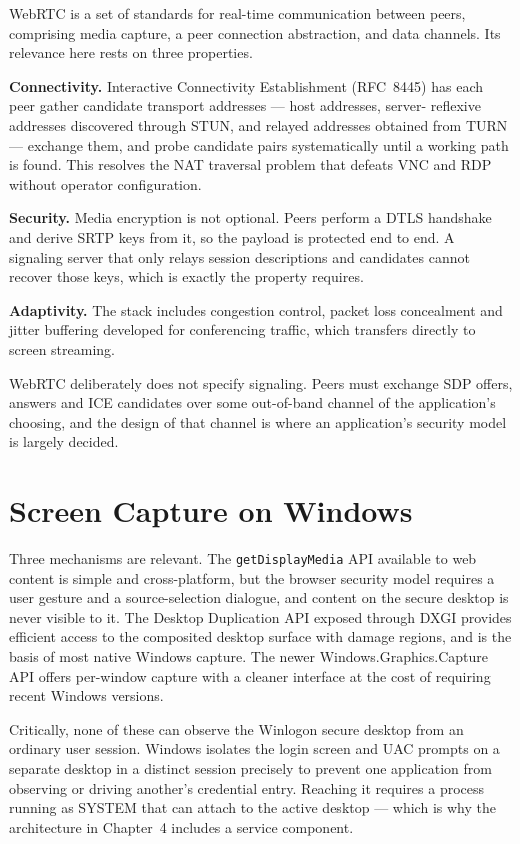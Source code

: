 WebRTC is a set of standards for real-time communication between peers,
comprising media capture, a peer connection abstraction, and data channels. Its
relevance here rests on three properties.

\textbf{Connectivity.} Interactive Connectivity Establishment (RFC~8445) has
each peer gather candidate transport addresses --- host addresses, server-
reflexive addresses discovered through STUN, and relayed addresses obtained from
TURN --- exchange them, and probe candidate pairs systematically until a
working path is found. This resolves the NAT traversal problem that defeats VNC
and RDP without operator configuration.

\textbf{Security.} Media encryption is not optional. Peers perform a DTLS
handshake and derive SRTP keys from it, so the payload is protected end to end.
A signaling server that only relays session descriptions and candidates cannot
recover those keys, which is exactly the property \updesk{} requires.

\textbf{Adaptivity.} The stack includes congestion control, packet loss
concealment and jitter buffering developed for conferencing traffic, which
transfers directly to screen streaming.

WebRTC deliberately does not specify signaling. Peers must exchange SDP offers,
answers and ICE candidates over some out-of-band channel of the application's
choosing, and the design of that channel is where an application's security
model is largely decided.

\section{Screen Capture on Windows}

Three mechanisms are relevant. The \texttt{getDisplayMedia} API available to web
content is simple and cross-platform, but the browser security model requires a
user gesture and a source-selection dialogue, and content on the secure desktop
is never visible to it. The Desktop Duplication API exposed through DXGI
provides efficient access to the composited desktop surface with damage regions,
and is the basis of most native Windows capture. The newer
Windows.Graphics.Capture API offers per-window capture with a cleaner interface
at the cost of requiring recent Windows versions.

Critically, none of these can observe the Winlogon secure desktop from an
ordinary user session. Windows isolates the login screen and UAC prompts on a
separate desktop in a distinct session precisely to prevent one application from
observing or driving another's credential entry. Reaching it requires a process
running as SYSTEM that can attach to the active desktop --- which is why the
architecture in Chapter~4 includes a service component.

